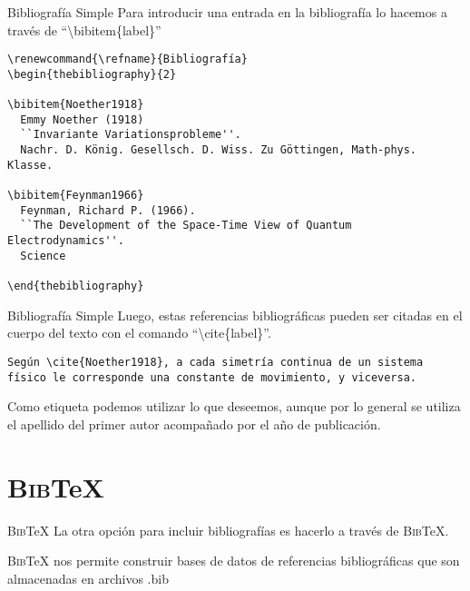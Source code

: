\documentclass[11pt]{beamer}
\begin{document}
\begin{frame}[fragile]{Bibliografía Simple}
Para introducir una entrada en la bibliografía lo hacemos a través de ``\textbackslash bibitem\{label\}''

{\color{new_green} \scriptsize
\begin{verbatim}
\renewcommand{\refname}{Bibliografía}
\begin{thebibliography}{2}

\bibitem{Noether1918}
  Emmy Noether (1918)
  ``Invariante Variationsprobleme''.
  Nachr. D. König. Gesellsch. D. Wiss. Zu Göttingen, Math-phys. Klasse.

\bibitem{Feynman1966}
  Feynman, Richard P. (1966).
  ``The Development of the Space-Time View of Quantum Electrodynamics''.
  Science

\end{thebibliography}
\end{verbatim}
}
\end{frame}


\begin{frame}[fragile]{Bibliografía Simple}
Luego, estas referencias bibliográficas pueden ser citadas en el cuerpo del texto con el comando ``\textbackslash cite\{label\}''.

{\color{new_green} \scriptsize
\begin{verbatim}
Según \cite{Noether1918}, a cada simetría continua de un sistema
físico le corresponde una constante de movimiento, y viceversa.
\end{verbatim}
}

Como etiqueta podemos utilizar lo que deseemos, aunque por lo general se utiliza el apellido del primer autor acompañado por el año de publicación.

\end{frame}

\section{\textsc{Bib}\TeX{}}

\begin{frame}{\textsc{Bib}\TeX{}}
La otra opción para incluir bibliografías es hacerlo a través de \textsc{Bib}\TeX{}.

\textsc{Bib}\TeX{} nos permite construir bases de datos de referencias bibliográficas que son almacenadas en archivos .bib


\end{frame}
\end{document}
